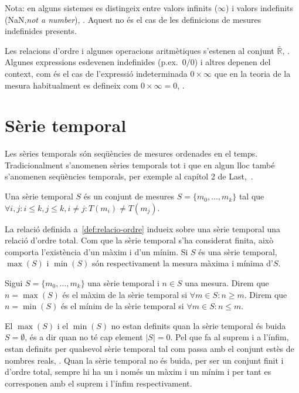 Nota: en alguns sistemes es distingeix entre valors infinits ($\infty$) i valors indefinits (NaN,\emph{not a number}), \cite{wiki:ieee754}. Aquest no és el cas de les definicions de mesures indefinides presents.

Les relacions d'ordre i algunes operacions aritmètiques s'estenen al
conjunt $\bar{\mathbb{R}}$, \cite{cantrell:extendedreal}.  Algunes
expressions esdevenen indefinides (p.ex.\ $0/0$) i altres depenen del
context, com és el cas de l'expressió indeterminada $0 \times \infty$ que
en la teoria de la mesura habitualment es defineix com $0 \times
\infty = 0$, \cite{wiki:extendedreal}.


\section{Sèrie temporal}
\label{sec:model:serietemporal}

Les sèries temporals són seqüències de mesures ordenades en el temps. 
Tradicionalment s'anomenen sèries temporals tot i que en algun lloc també s'anomenen seqüències temporals, per exemple al capítol 2 de Last,~\cite{last}.


\begin{definition}
  \label{def:serie_temporal}
  Una sèrie temporal $S$ és un conjunt de mesures
  $S=\{m_0,\ldots,m_k\}$ tal que 
  $\forall i,j: i\leq k, j\leq k, i\neq j : T(m_i)\neq T(m_j)$.
\end{definition}

La relació definida a~\ref{def:relacio-ordre} indueix sobre una sèrie
temporal una relació d'ordre total. Com que la sèrie temporal s'ha
considerat finita, això comporta l'existència d'un màxim i d'un mínim.
Si $S$ és una sèrie temporal, $\max(S)$ i $\min(S)$ són respectivament
la mesura màxima i mínima d'$S$. 

\begin{definition}
  Sigui $S=\{m_0,\ldots,m_k\}$ una sèrie temporal i $n\in S$ una
  mesura.  Direm que $n=\max(S)$ és el màxim de la sèrie temporal si
  $\forall m \in S: n \geq m $.  Direm que $n=\min(S)$ és el mínim de
  la sèrie temporal si $\forall m \in S: n \leq m$.
\end{definition}

El $\max(S)$ i el $\min(S)$ no estan definits quan la sèrie temporal
és buida $S= \emptyset$, és a dir quan no té cap element $|S|=0$. Pel
que fa al suprem i a l'ínfim, estan definits per qualsevol sèrie
temporal tal com passa amb el conjunt estès de nombres reals,
\cite{cantrell:extendedreal}.  Quan la sèrie temporal no és buida, per
ser un conjunt finit i d'ordre total, sempre hi ha un i només un màxim
i un mínim i per tant es corresponen amb el suprem i l'ínfim
respectivament.

